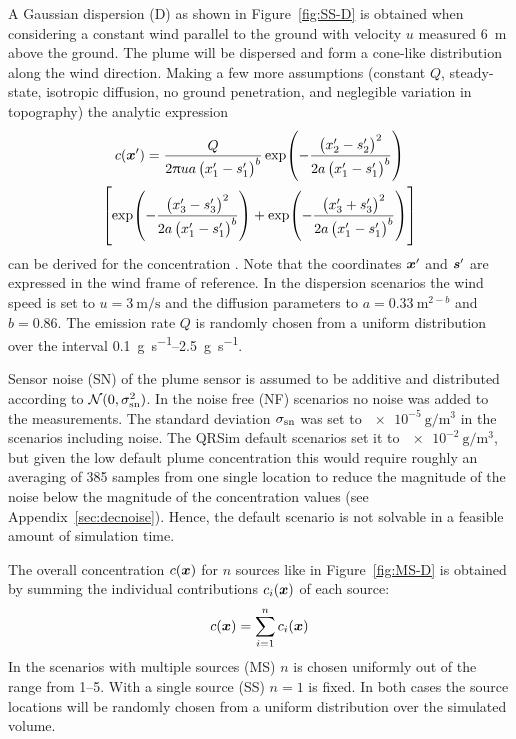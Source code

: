 A Gaussian dispersion (D) as shown in Figure~\ref{fig:SS-D} is obtained when 
considering a constant wind parallel to the ground with velocity $u$ measured 
\SI{6}{\meter} above the ground. The plume will be dispersed and form 
a cone-like distribution along the wind direction.  Making a few more 
assumptions (constant $Q$, steady-state, isotropic diffusion, no ground 
penetration, and neglegible variation in topography) the analytic expression
\begin{multline}\label{eqn:plumedisp}
    c(\vc x') = \frac{Q}{2\uppi ua\del{x'_1 - s'_1}^b} 
    \exp\!\del{-\frac{\del{x'_2 - s'_2}^2}{2a\del{x'_1 - s'_1}^b}} \\ 
    \sbr{\exp\!\del{-\frac{\del{x'_3 - s'_3}^2}{2a\del{x'_1 - s'_1}^b}} 
        + \exp\!\del{-\frac{\del{x'_3 + s'_3}^2}{2a\del{x'_1 - s'_1}^b}}}
\end{multline}
can be derived for the concentration \parencite{Stockie:2011fd}. Note that the 
coordinates $\bm{x}'$ and $\bm{s}'$ are expressed in the wind frame of reference.  
In the dispersion scenarios the wind speed is set to $u 
= \SI{3}{\meter\per\second}$ and the diffusion parameters to $a 
= \SI{0.33}{\meter\tothe{2 - \mathit{b}}}$ and $b = 0.86$.  The emission rate 
$Q$ is randomly chosen from a uniform distribution over the interval 
\SIrange{0.1}{2.5}{\gram\per\second}.

Sensor noise (SN) of the plume sensor is assumed to be additive and distributed 
according to $\mathcal{N}(0, \sigma_{\mathrm{sn}}^2)$. In the noise free (NF) 
scenarios no noise was added to the measurements. The standard deviation 
$\sigma_{\mathrm{sn}}$ was set to $\SI{e-5}{\gram\per\meter\cubed}$ in the scenarios 
including noise.  The QRSim default scenarios set it to 
$\SI{e-2}{\gram\per\meter\cubed}$, but given the low default plume concentration 
this would require roughly an averaging of 385 samples from one single location 
to reduce the magnitude of the noise below the magnitude of the concentration 
values (see Appendix~\ref{sec:decnoise}).  Hence, the default scenario is not 
solvable in a feasible amount of simulation time.

The overall concentration $c(\bm{x})$ for $n$ sources like in 
Figure~\ref{fig:MS-D} is obtained by summing the individual contributions 
$c_i(\bm{x})$ of each source:
\begin{equation}
    c(\bm{x}) = \sum_{i = 1}^n c_i(\bm{x})
\end{equation}
In the scenarios with multiple sources (MS) $n$ is chosen uniformly out of the 
range from \numrange{1}{5}. With a single source (SS) $n = 1$ is fixed. In both 
cases the source locations will be randomly chosen from a uniform distribution 
over the simulated volume.

